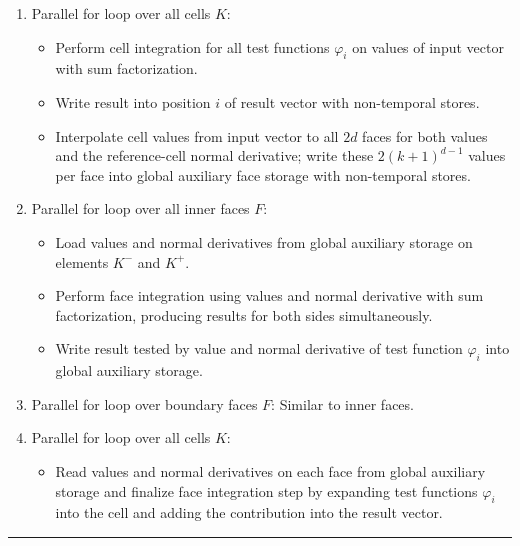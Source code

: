 \documentclass[a4paper,12pt]{article}
\begin{document}
\begin{enumerate}[label=\arabic*., leftmargin=2em, itemsep=0.8em]
	\item Parallel for loop over all cells $K$:
	\begin{itemize}[label=--, leftmargin=2em, itemsep=0.2em]
		\item Perform cell integration for all test functions $\varphi_i$ on values of input vector with sum factorization.
		\item Write result into position $i$ of result vector with non-temporal stores.
		\item Interpolate cell values from input vector to all $2d$ faces for both values and the reference-cell normal derivative; write these $2(k+1)^{d-1}$ values per face into global auxiliary face storage with non-temporal stores.
	\end{itemize}
	
	\item Parallel for loop over all inner faces $F$:
	\begin{itemize}[label=--, leftmargin=2em, itemsep=0.2em]
		\item Load values and normal derivatives from global auxiliary storage on elements $K^-$ and $K^+$.
		\item Perform face integration using values and normal derivative with sum factorization, producing results for both sides simultaneously.
		\item Write result tested by value and normal derivative of test function $\varphi_i$ into global auxiliary storage.
	\end{itemize}
	
	\item Parallel for loop over boundary faces $F$: Similar to inner faces.
	
	\item Parallel for loop over all cells $K$:
	\begin{itemize}[label=--, leftmargin=2em, itemsep=0.2em]
		\item Read values and normal derivatives on each face from global auxiliary storage and finalize face integration step by expanding test functions $\varphi_i$ into the cell and adding the contribution into the result vector.
	\end{itemize}
\end{enumerate}

\vspace{-0.5em}
\noindent\rule{\textwidth}{1pt}


\end{document}
